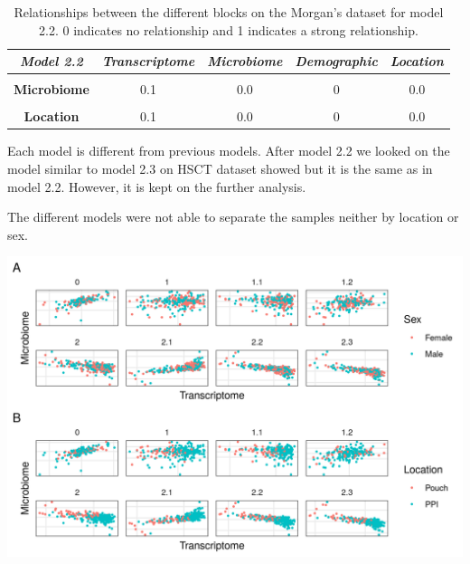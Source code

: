 \documentclass[
  12pt,
  a4paper,
  twoside,
  openright]{book}
\let\origfigure\figure
\let\endorigfigure\endfigure
\renewenvironment{figure}[1][2] {
    \expandafter\origfigure\expandafter[!ht]
} {
    \endorigfigure
}
\begin{document}
\begin{table}[H]

\caption[Model 2.2 of Morgan's dataset.]{\label{tab:morgan-model2-2}Relationships between the different blocks on the Morgan's dataset for model 2.2. 0 indicates no relationship and 1 indicates a strong relationship.}
\centering
\begin{tabular}[t]{|>{}c|c|c|c|>{}c|}
\hline
\em{\textbf{Model 2.2}} & \em{\textbf{Transcriptome}} & \em{\textbf{Microbiome}} & \em{\textbf{Demographic}} & \em{\textbf{Location}}\\
\hline
\textbf{\cellcolor{gray!6}{Transcriptome}} & \cellcolor{gray!6}{0.0} & \cellcolor{gray!6}{0.1} & \cellcolor{gray!6}{1} & \cellcolor{gray!6}{0.1}\\
\hline
\textbf{Microbiome} & 0.1 & 0.0 & 0 & 0.0\\
\hline
\textbf{\cellcolor{gray!6}{Demographic}} & \cellcolor{gray!6}{1.0} & \cellcolor{gray!6}{0.0} & \cellcolor{gray!6}{0} & \cellcolor{gray!6}{0.0}\\
\hline
\textbf{Location} & 0.1 & 0.0 & 0 & 0.0\\
\hline
\end{tabular}
\end{table}

Each model is different from previous models.
After model 2.2 we looked on the model similar to model 2.3 on HSCT dataset showed but it is the same as in model 2.2.
However, it is kept on the further analysis.

The different models were not able to separate the samples neither by location or sex.

\begin{figure}
\includegraphics[width=1\linewidth]{images/morgan_models} \caption[First component of the transcriptome and microbiome of models on the Morgan's dataset. ]{First component of the transcriptome and microbiome of models on the Morgan's dataset. Model 0 without sample data. Model 1 to 1.2 with all the sample data in a single block and models 2.1 to 2.3 with sample data in several blocks. Panel A shows samples colored by sex and panel B by segment of the sample. There is no clear classification neither by location nor sex on any of the models.}\label{fig:morgan-models}
\end{figure}
\end{document}
